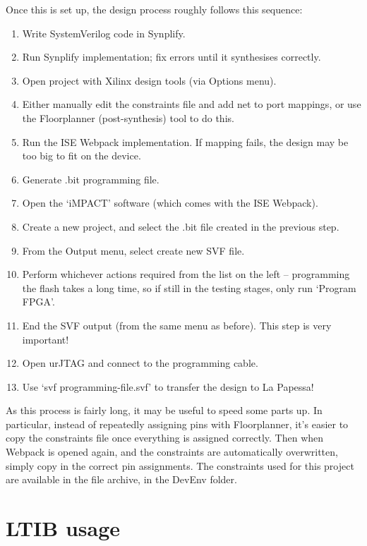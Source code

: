 	Once this is set up, the design process roughly follows this sequence:
	\begin{enumerate}
		\item Write SystemVerilog code in Synplify.
		\item Run Synplify implementation; fix errors until it synthesises correctly.
		\item Open project with Xilinx design tools (via Options menu).
		\item Either manually edit the constraints file and add net to port mappings, or use the Floorplanner (post-synthesis) tool to do this.
		\item Run the ISE Webpack implementation.  If mapping fails, the design may be too big to fit on the device.
		\item Generate .bit programming file.
		\item Open the `iMPACT' software (which comes with the ISE Webpack).
		\item Create a new project, and select the .bit file created in the previous step.
		\item From the Output menu, select create new SVF file.
		\item Perform whichever actions required from the list on the left -- programming the flash takes a long time, so if still in the testing stages, only run `Program FPGA'.
		\item End the SVF output (from the same menu as before).  This step is very important!
		\item Open urJTAG and connect to the programming cable.
		\item Use `svf programming-file.svf' to transfer the design to La Papessa!
	\end{enumerate}

	As this process is fairly long, it may be useful to speed some parts up.  In particular, instead of repeatedly assigning pins with Floorplanner, it's easier to copy the constraints file once everything is assigned correctly.  Then when Webpack is opened again, and the constraints are automatically overwritten, simply copy in the correct pin assignments.  The constraints used for this project are available in the file archive, in the DevEnv folder.



\section{LTIB usage} %
\label{apdx:ltib_usage}

